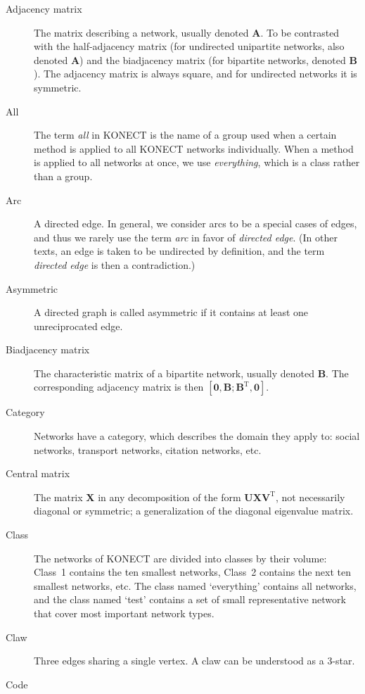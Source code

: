 \documentclass{article}
\begin{document}
\begin{description}
  \item[Adjacency matrix]
    The matrix describing a network, usually denoted $\mathbf A$.  To be
    contrasted with the 
    half-adjacency matrix (for undirected unipartite networks, also
    denoted $\mathbf A$) and the
    biadjacency matrix (for bipartite networks, denoted $\mathbf B$). 
    The adjacency matrix is always square, and for undirected networks
    it is symmetric. 
  \item[All] The term \emph{all} in KONECT is the name of a group used when a certain method
    is applied to all KONECT networks individually.  When a method is
    applied to all networks at once, we use \emph{everything}, which is
    a class rather than a group. 
  \item[Arc] A directed edge.  In general, we consider arcs to be a
    special cases of edges, and thus we rarely use the term \emph{arc}
    in favor of \emph{directed edge}.  (In other texts, an edge is taken
    to be undirected by definition, and the term \emph{directed edge} is
    then a contradiction.)
  \item[Asymmetric] A directed graph is called asymmetric if it contains
    at least one unreciprocated edge. 
  \item[Biadjacency matrix]
    The characteristic matrix of a bipartite network, usually denoted
    $\mathbf B$.  The corresponding adjacency matrix is then $[\mathbf
      0, \mathbf B; \mathbf B^{\mathrm T}, \mathbf 0]$. 
  \item[Category] Networks have a category, which describes the domain
    they apply to:  social networks, transport networks, citation
    networks, etc. 
  \item[Central matrix] The matrix $\mathbf X$ in any decomposition
    of the form $\mathbf U \mathbf X \mathbf V^{\mathrm T}$, not necessarily
    diagonal or symmetric; a generalization of the diagonal eigenvalue
    matrix.
  \item[Class]
    The networks of KONECT are divided into classes by their volume:
    Class~1 contains the ten smallest networks, Class~2 contains the
    next ten smallest networks, etc.  The class named `everything' contains all
    networks, and the class named `test' contains a set of small
    representative network that cover most important network types. 
  \item[Claw]
    Three edges sharing a single vertex.  A claw can be understood as a 3-star. 
  \item[Code]

\end{description}
\end{document}
